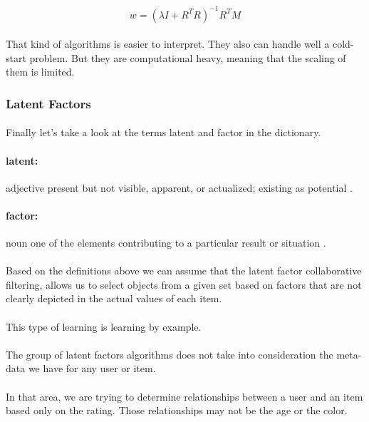\begin{equation}
w=(\lambda I + R^{T}R)^{-1} R^{T}M 
\end{equation}

\paragraph{}That kind of algorithms is easier to interpret. They also can handle well a cold-start problem. But they are computational heavy, meaning that the scaling of them is limited.

\subsubsection{Latent Factors}
\paragraph{} Finally let's take a look at the terms latent and factor in the dictionary.
\paragraph{latent:} adjective present but not visible, apparent, or actualized; existing as potential \cite{Dictionary.com2017}.
\paragraph{factor:} noun one of the elements contributing to a particular result or situation \cite{Dictionary.com2017}.
\paragraph{} Based on the definitions above we can assume that the latent factor collaborative filtering, allows us to select objects from a given set based on factors that are not clearly depicted in the actual values of each item.
\paragraph{} This type of learning is learning by example.
\paragraph{} The group of latent factors algorithms does not take into consideration the meta-data we have for any user or item. 
\paragraph{} In that area, we are trying to determine relationships between a user and an item based only on the rating. Those relationships may not be the age or the color.


